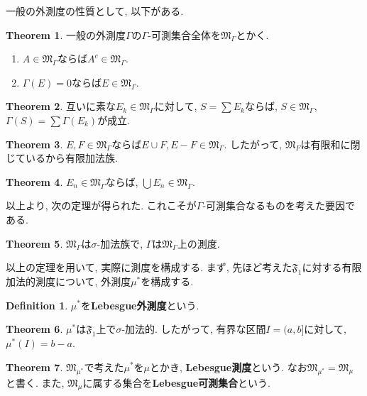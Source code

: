\documentclass[a4j,dvipdfmx]{jsarticle}
\newcommand{\F}{\mathfrak{F}}
\newcommand{\M}{\mathfrak{M}}
\theoremstyle{definition}
\newtheorem{definition}{Definition}[section]
\theoremstyle{definition}
\newtheorem{theorem}{Theorem}[section]
\numberwithin{equation}{section}
\begin{document}
            一般の外測度の性質として, 以下がある.
            \begin{theorem} 一般の外測度$\Gamma$の$\Gamma$-可測集合全体を$\M_\Gamma$とかく.
                \begin{enumerate}\renewcommand{\labelenumi}{(\arabic{enumi})}
                    \item $A\in\M_\Gamma$ならば$A^c\in\M_\Gamma$.
                    \item $\Gamma(E)=0$ならば$E\in\M_\Gamma$.
                \end{enumerate}
            \end{theorem}

            \begin{theorem}
                互いに素な$E_k\in\M_\Gamma$に対して, $S=\sum E_k$ならば, $S\in\M_\Gamma$, $\Gamma(S)=\sum\Gamma(E_k)$が成立.
            \end{theorem}

            \begin{theorem}
                $E,F\in\M_\Gamma$ならば$E\cup F,E-F\in\M_\Gamma$. したがって, $\M_F$は有限和に閉じているから有限加法族.
            \end{theorem}

            \begin{theorem}
                $E_n\in\M_\Gamma$ならば, $\bigcup E_n\in\M_\Gamma$.
            \end{theorem}

            以上より, 次の定理が得られた. これこそが$\Gamma$-可測集合なるものを考えた要因である.
            \begin{theorem}
                $\M_\Gamma$は$\sigma$-加法族で, $\Gamma$は$\M_\Gamma$上の測度.
            \end{theorem}

            以上の定理を用いて, 実際に測度を構成する. まず, 先ほど考えた$\F_1$に対する有限加法的測度について, 外測度$\mu^*$を構成する.

            \begin{definition}
                $\mu^*$を\textbf{Lebesgue外測度}という.
            \end{definition}
            
            \begin{theorem}
                $\mu^*$は$\F_1$上で$\sigma$-加法的. したがって, 有界な区間$I=(a,b]$に対して, $\mu^* (I)=b-a$.
            \end{theorem}

            \begin{theorem}
                $\M_{\mu^*}$で考えた$\mu^*$を$\mu$とかき, \textbf{Lebesgue測度}という. なお$\M_{\mu^*}=\M_\mu$と書く. また, $\M_\mu$に属する集合を\textbf{Lebesgue可測集合}という.
            \end{theorem}
\end{document}
